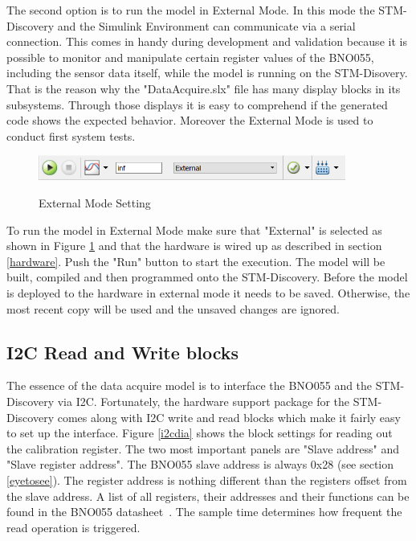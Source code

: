 \documentclass[a4paper]{article}
\begin{document}
\bigskip

The second option is to run the model in External Mode. In this mode the STM-Discovery and the Simulink Environment can communicate via a serial connection. This comes in handy during development and validation because it is possible to monitor and manipulate certain register values of the BNO055, including the sensor data itself, while the model is running on the STM-Disovery. That is the reason why the "DataAcquire.slx" file has many display blocks in its subsystems. Through those displays it is easy to comprehend if the generated code shows the expected behavior. Moreover the External Mode is used to conduct first system tests.

\begin{figure}[htb]
\centering
	{\includegraphics*[trim=0mm 0mm 0mm 0mm,width=0.9\textwidth]{externalmode}}
	\caption{External Mode Setting }
	\label{external}
\end{figure}

To run the model in External Mode make sure that "External" is selected as shown in Figure \ref{external} and that the hardware is wired up as described in section \ref{hardware}. Push the "Run" button to start the execution. The model will be built, compiled and then programmed onto the STM-Discovery. Before the model is deployed to the hardware in external mode it needs to be saved. Otherwise, the most recent copy will be used and the unsaved changes are ignored.

\subsection{I2C Read and Write blocks}

The essence of the data acquire model is to interface the BNO055 and the STM-Discovery via I2C. Fortunately, the hardware support package for the STM-Discovery comes along with I2C write and read blocks which make it fairly easy to set up the interface. Figure \ref{i2cdia} shows the block settings for reading out the calibration register. The two most important panels are "Slave address" and "Slave register address". The BNO055 slave address is always 0x28 (see section \ref{eyetosee}). The register address is nothing different than the registers offset from the slave address. A list of all registers, their addresses and their functions can be found in the BNO055 datasheet~\cite{BNO1}. The sample time determines how frequent the read operation is triggered.     
\end{document}
